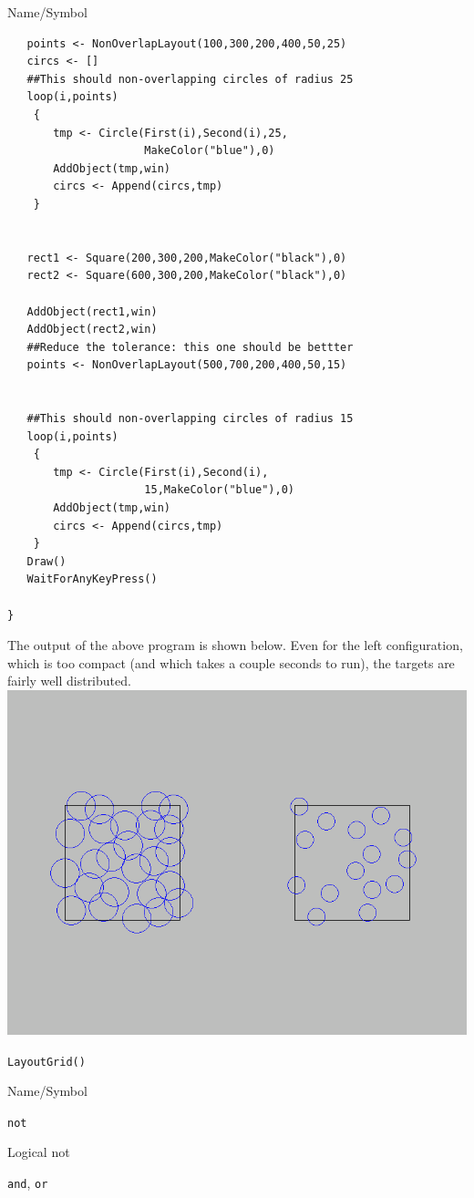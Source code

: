 \begin{desc}{Name/Symbol}
\begin{verbatim}
   points <- NonOverlapLayout(100,300,200,400,50,25)
   circs <- []
   ##This should non-overlapping circles of radius 25
   loop(i,points)
    {
       tmp <- Circle(First(i),Second(i),25,
                     MakeColor("blue"),0) 
       AddObject(tmp,win)
       circs <- Append(circs,tmp)
    }


   rect1 <- Square(200,300,200,MakeColor("black"),0)
   rect2 <- Square(600,300,200,MakeColor("black"),0)

   AddObject(rect1,win)
   AddObject(rect2,win)
   ##Reduce the tolerance: this one should be bettter
   points <- NonOverlapLayout(500,700,200,400,50,15)


   ##This should non-overlapping circles of radius 15
   loop(i,points)
    {
       tmp <- Circle(First(i),Second(i),
                     15,MakeColor("blue"),0) 
       AddObject(tmp,win)
	   circs <- Append(circs,tmp)
    }
   Draw()
   WaitForAnyKeyPress()

}
\end{verbatim}
\clearpage
The output of the above program is shown below.  Even for the left configuration, which is too compact (and which takes a couple seconds to run), the targets are fairly well distributed.
\includegraphics[scale=.35]{images/nonoverlap.png} 


\item[See Also]     
\verb+LayoutGrid()+
\end{desc}





\begin{desc}{Name/Symbol}
\item[Name/Symbol]	\verb+not+

\item[Description]	Logical not

\item[Usage]		

\item[Example]	

\item[See Also]	\verb+and+, \verb+or+
\end{desc}



